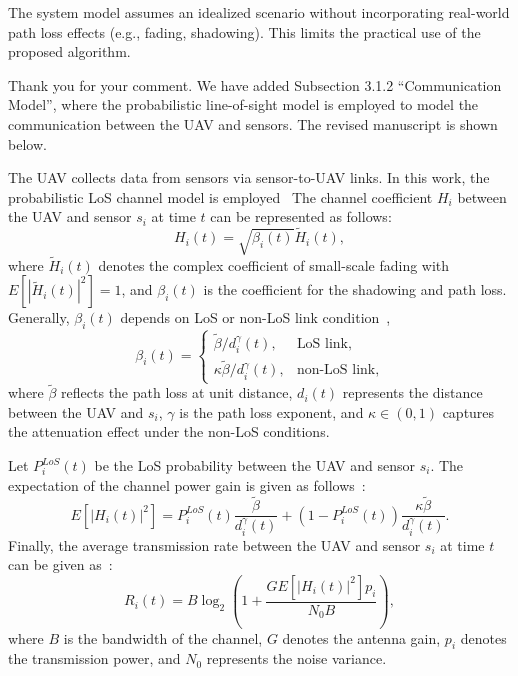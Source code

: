 \begin{revcomment}
	The system model assumes an idealized scenario without incorporating real-world path loss effects (e.g., fading, shadowing). This limits the practical use of the proposed algorithm.
\end{revcomment}
\begin{revresponse}
	Thank you for your comment.
	We have added Subsection 3.1.2 ``Communication Model'', where the probabilistic line-of-sight model is employed to model the communication between the UAV and sensors.
	The revised manuscript is shown below.
	\begin{changes}
		The UAV collects data from sensors via sensor-to-UAV links.
		In this work, the probabilistic LoS channel model is employed~\cite{a-constspeed2}
		The channel coefficient $H_i$ between the UAV and sensor $s_i$ at time $t$ can be represented as follows:
		\begin{equation}
			H_i(t) = \sqrt{\beta_i(t)}\widetilde{H}_i(t), 
		\end{equation}
		where $\widetilde{H}_i(t)$ denotes the complex coefficient of small-scale fading with $E[|\widetilde{H}_i(t)|^2]=1$, and $\beta_i(t)$ is the coefficient for the shadowing and path loss.
		Generally, $\beta_i(t)$ depends on LoS or non-LoS link condition~\cite{Zeng},
		\begin{equation}
		\beta_i(t)=\begin{cases}
			\widetilde{\beta}/d_i^\gamma(t), & \mbox{LoS link,} \\
			\kappa\widetilde{\beta}/d_i^\gamma(t), & \mbox{non-LoS link,} 
		\end{cases}
		\end{equation}
		where $\widetilde{\beta}$ reflects the path loss at unit distance, $d_i(t)$ represents the distance between the UAV and $s_i$, $\gamma$ is the path loss exponent, and $\kappa\in(0,1)$ captures the attenuation effect under the non-LoS conditions.

		Let $P^{LoS}_i(t)$ be the LoS probability between the UAV and sensor $s_i$.
		The expectation of the channel power gain is given as follows~\cite{a-constspeed2}:
		\begin{equation}
			E[|H_i(t)|^2] = P^{LoS}_i(t)\frac{\widetilde{\beta}}{d_i^{\gamma}(t)} + (1-P^{LoS}_i(t))\frac{\kappa\widetilde{\beta}}{d_i^{\gamma}(t)}.
		\end{equation}
		Finally, the average transmission rate between the UAV and sensor $s_i$ at time $t$ can be given as~\cite{trans-rate}:
		\begin{equation}
			R_i(t)=B\log_2(1+\frac{GE[|H_i(t)|^2]p_i}{N_0B}),
			\label{eq:rate}
		\end{equation}
		where $B$ is the bandwidth of the channel, $G$ denotes the antenna gain, $p_i$ denotes the transmission power, and $N_0$ represents the noise variance.
	\end{changes}
\end{revresponse}

